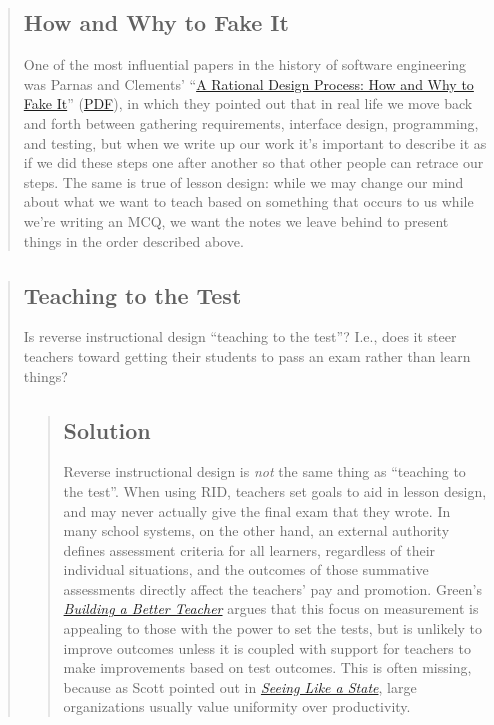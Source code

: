 \begin{quotation}   %
\subsection*{How and Why to Fake It}

One of the most influential papers in the history of software engineering
was Parnas and Clements' ``\href{http://dx.doi.org/10.1109/TSE.1986.6312940}{A Rational Design Process: How and Why to Fake It}''
(\href{http://www.ics.uci.edu/\ensuremath{\sim}taylor/classes/121/IEEE86\_Parnas\_Clement.pdf}{PDF}),
in which they pointed out that in real life we move back and forth between gathering requirements,
interface design,
programming,
and testing,
but when we write up our work
it's important to describe it as if we did these steps one after another
so that other people can retrace our steps.
The same is true of lesson design:
while we may change our mind about what we want to teach
based on something that occurs to us while we're writing an MCQ,
we want the notes we leave behind to present things in the order described above.
\end{quotation}   %

\begin{quotation}   %
\subsection*{Teaching to the Test}

Is reverse instructional design ``teaching to the test''?
I.e., does it steer teachers toward getting their students to pass an exam
rather than learn things?

\begin{quotation}   %
\subsection*{Solution}

Reverse instructional design is \emph{not} the same thing as ``teaching to the test''.
When using RID, teachers set goals to aid in lesson design,
and may never actually give the final exam that they wrote.
In many school systems,
on the other hand,
an external authority defines assessment criteria for all learners,
regardless of their individual situations,
and the outcomes of those summative assessments directly affect the teachers' pay and promotion.
Green's \emph{\href{http://www.amazon.com/Building-Better-Teacher-Teaching-Everyone/dp/0393351084/}{Building a Better Teacher}} argues that this focus on measurement
is appealing to those with the power to set the tests,
but is unlikely to improve outcomes unless it is coupled with
support for teachers to make improvements based on test outcomes.
This is often missing,
because as Scott pointed out in \emph{\href{http://www.amazon.com/Seeing-like-State-Certain-Condition/dp/0300078153/}{Seeing Like a State}},
large organizations usually value uniformity over productivity.
\end{quotation}   %
\end{quotation}   %

